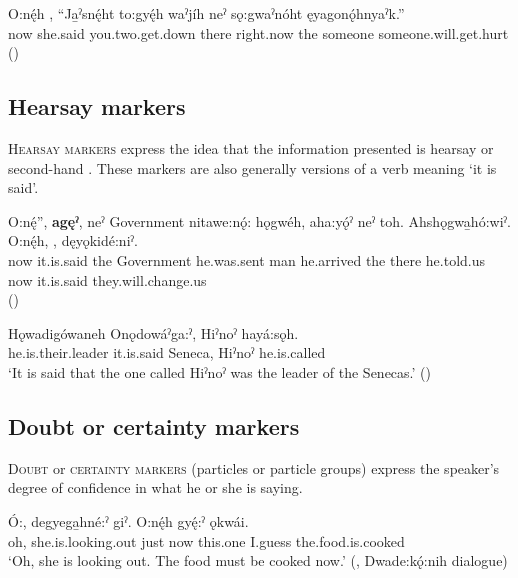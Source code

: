 \ea\label{ex:quotex2}
 \gll O:nę́h , “Ja̱ˀsnę́ht to:gyę́h waˀjíh neˀ sǫ:gwaˀnóht ęyagonǫ́hnyaˀk.”\\
now she.said you.two.get.down there right.now the someone someone.will.get.hurt\\
\glt {} (\cite{henry_de_2005})
\z

\subsection{Hearsay markers} \label{ch:Hearsay markers}
\textsc{Hearsay markers} express the idea that the information presented is hearsay or second-hand . These markers are also generally versions of a verb meaning ‘it is said’. 

\ea\label{ex:hearsay1}
 \gll O:nę́”, \textbf{agęˀ}, neˀ Government nitawe:nǫ́: hǫgwéh, aha:yǫ́ˀ neˀ toh. Ahshǫgwa̱hó:wiˀ. O:nę́h, , dęyǫkidé:niˀ. \\
now it.is.said the Government he.was.sent man he.arrived the there he.told.us now it.is.said they.will.change.us\\
\glt {} (\cite{henry_de_2005})
\z

\ea\label{ex:hearsay3}
 \gll Hǫwadigówaneh  Onǫdowáˀga:ˀ, Hiˀnoˀ hayá:sǫh. \\
he.is.their.leader it.is.said Seneca, Hiˀnoˀ he.is.called\\
\glt ‘It is said that the one called Hiˀnoˀ was the leader of the Senecas.’ (\cite{carrier_legends_2013})
\z


\subsection{Doubt or certainty markers} \label{ch:Doubt or certainty markers}
\textsc{Doubt} or \textsc{certainty markers} (particles or particle groups) express the speaker’s degree of confidence in what he or she is saying. 

\ea\label{ex:doubtcertainty}
 \gll Ó:, degyega̱hné:ˀ giˀ. O:nę́h gyę́:ˀ  ǫkwái. \\
oh, she.is.looking.out just now this.one I.guess the.food.is.cooked \\
\glt ‘Oh, she is looking out. The food must be cooked now.’ (\cite[294]{mithun_watewayestanih_1984}, Dwade:kǫ́:nih dialogue) 
\z

